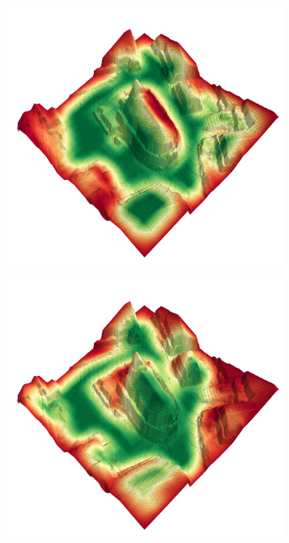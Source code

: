 \documentclass[../document.tex]{subfiles}
\begin{document}
\begin{figure}[H]
\begin{subfigure}[b]{0.45\textwidth}
        \includegraphics[width=\linewidth]{../img/4/traversability/sullens-church/-90.png}
    \end{subfigure}
    \begin{subfigure}[b]{0.45\textwidth}
      \includegraphics[width=\linewidth]{../img/4/traversability/sullens-church/-0.png}

\end{subfigure}
\end{figure}
\end{document}
